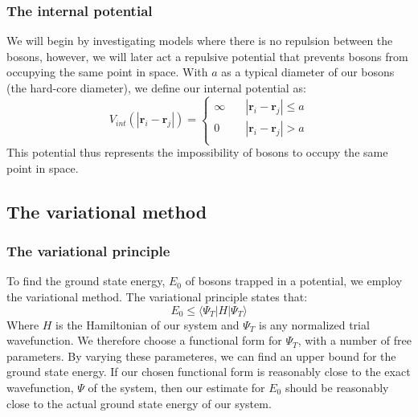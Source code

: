 \documentclass[a4paper, 10pt]{article}
\begin{document}
\subsubsection{The internal potential}
We will begin by investigating models where there is no repulsion between the bosons, however, we will later act a repulsive potential that prevents bosons from occupying the same point in space. With $a$ as a typical diameter of our bosons (the hard-core diameter), we define our internal potential as:
\begin{equation}
V_{int}(|\boldsymbol{r}_i-\boldsymbol{r}_j|)= 
     \begin{cases}
       \infty & \quad |\boldsymbol{r}_i-\boldsymbol{r}_j| \leq  a\\
       0 & \quad |\boldsymbol{r}_i-\boldsymbol{r}_j|>  a\\
     \end{cases}
\end{equation}
This potential thus represents the impossibility of bosons to occupy the same point in space.
\subsection{The variational method}
\subsubsection{The variational principle}
To find the ground state energy, $E_0$ of bosons trapped in a potential, we employ the variational method. The variational principle states that:
\begin{equation}
E_0\leq \langle \Psi_T |H|\Psi_T \rangle
\end{equation}
Where $H$ is the Hamiltonian of our system and $\Psi_T$ is any normalized trial wavefunction. We therefore choose a functional form for $\Psi_T$, with a number of free parameters. By varying these parameteres, we can find an upper bound for the ground state energy. If our chosen functional form is reasonably close to the exact wavefunction, $\Psi$ of the system, then our estimate for $E_0$ should be reasonably close to the actual ground state energy of our system.
\end{document}
